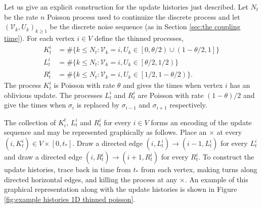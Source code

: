 	Let us give an explicit construction for the update histories just described. Let $N_t$ be the rate $n$ Poisson process used to continuize the discrete process and let $(\mathcal{V}_k, U_k)_{k\geq1}$ be the discrete noise sequence (as in Section \ref{sec:the coupling time}). For each vertex $i \in V$ define the thinned processes,
	\begin{align}
		K^i_t &= \#\{k \leq N_t: \mathcal{V}_k = i, U_k \in \left[0, \theta/2\right) \cup \left(1 - \theta/2, 1\right]\}\\
		L^i_t &= \#\{k \leq N_t: \mathcal{V}_k = i, U_k \in \left[\theta/2, 1/2\right)\}\\
		R^i_t &= \#\{k \leq N_t: \mathcal{V}_k = i, U_k \in \left[1/2, 1 - \theta/2\right)\}.
	\end{align}
	The process $K_t^i$ is Poisson with rate $\theta$ and gives the times when vertex $i$ has an oblivious update. The processes $L_t^i$ and $R_t^i$ are Poisson with rate $(1 - \theta)/2$ and give the times when $\sigma_i$ is replaced by $\sigma_{i-1}$ and $\sigma_{i+1}$ respectively.

	The collection of $K_i^t$, $L_t^i$ and $R_t^i$ for every $i \in V$ forms an encoding of the update sequence and may be represented graphically as follows. Place an $\times$ at every $(i, K_t^i) \in V \times [0, t_*]$. Draw a directed edge $(i, L_t^i) \rightarrow (i - 1, L_t^i)$ for every $L_t^i$ and draw a directed edge $(i, R_t^i) \rightarrow (i + 1, R_t^i)$ for every $R_t^i$. To construct the update histories, trace back in time from $t_*$ from each vertex, making turns along directed horizontal edges, and killing the process at any $\times$. An example of this graphical representation along with the update histories is shown in Figure \ref{fig:example histories 1D thinned poisson}.




